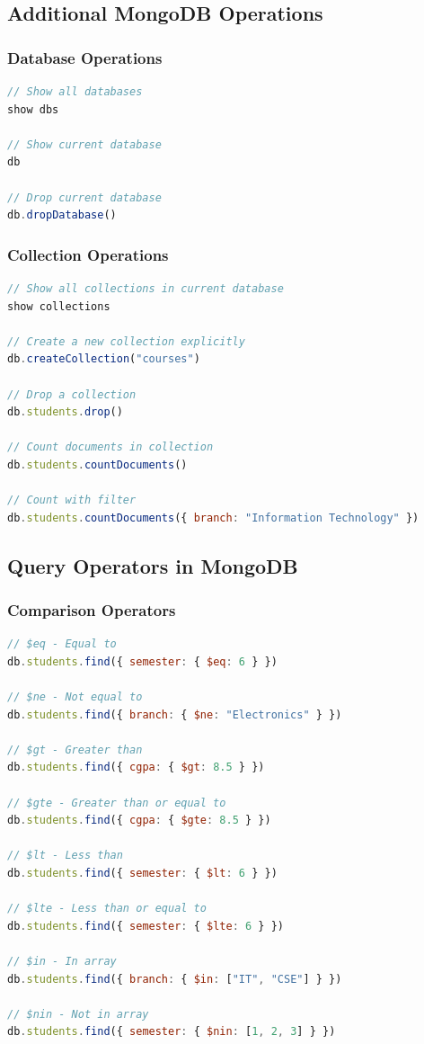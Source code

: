 \documentclass[12pt,a4paper]{article}
\begin{document}
\subsection{Additional MongoDB Operations}

\subsubsection{Database Operations}

\begin{lstlisting}[language=JavaScript]
// Show all databases
show dbs

// Show current database
db

// Drop current database
db.dropDatabase()
\end{lstlisting}

\subsubsection{Collection Operations}

\begin{lstlisting}[language=JavaScript]
// Show all collections in current database
show collections

// Create a new collection explicitly
db.createCollection("courses")

// Drop a collection
db.students.drop()

// Count documents in collection
db.students.countDocuments()

// Count with filter
db.students.countDocuments({ branch: "Information Technology" })
\end{lstlisting}

\subsection{Query Operators in MongoDB}

\subsubsection{Comparison Operators}

\begin{lstlisting}[language=JavaScript]
// $eq - Equal to
db.students.find({ semester: { $eq: 6 } })

// $ne - Not equal to
db.students.find({ branch: { $ne: "Electronics" } })

// $gt - Greater than
db.students.find({ cgpa: { $gt: 8.5 } })

// $gte - Greater than or equal to
db.students.find({ cgpa: { $gte: 8.5 } })

// $lt - Less than
db.students.find({ semester: { $lt: 6 } })

// $lte - Less than or equal to
db.students.find({ semester: { $lte: 6 } })

// $in - In array
db.students.find({ branch: { $in: ["IT", "CSE"] } })

// $nin - Not in array
db.students.find({ semester: { $nin: [1, 2, 3] } })
\end{lstlisting}
\end{document}
